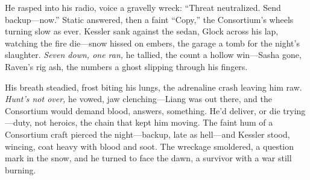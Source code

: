 \documentclass[12pt]{book}
\begin{document}
He rasped into his radio, voice a gravelly wreck: “Threat neutralized. Send backup—now.” Static answered, then a faint “Copy,” the Consortium’s wheels turning slow as ever. Kessler sank against the sedan, Glock across his lap, watching the fire die—snow hissed on embers, the garage a tomb for the night’s slaughter. \textit{Seven down, one ran,} he tallied, the count a hollow win—Sasha gone, Raven’s rig ash, the numbers a ghost slipping through his fingers.

His breath steadied, frost biting his lungs, the adrenaline crash leaving him raw. \textit{Hunt’s not over,} he vowed, jaw clenching—Liang was out there, and the Consortium would demand blood, answers, something. He’d deliver, or die trying—duty, not heroics, the chain that kept him moving. The faint hum of a Consortium craft pierced the night—backup, late as hell—and Kessler stood, wincing, coat heavy with blood and soot. The wreckage smoldered, a question mark in the snow, and he turned to face the dawn, a survivor with a war still burning.
\end{document}
